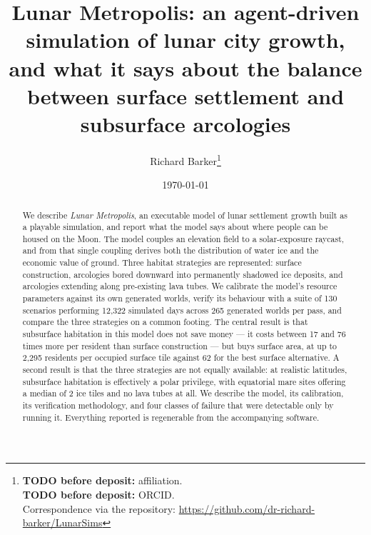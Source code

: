 \documentclass[11pt,a4paper]{article}
\title{\textbf{Lunar Metropolis}: an agent-driven simulation of lunar city
growth, and what it says about the balance between surface settlement and
subsurface arcologies}
\author{Richard Barker\thanks{%
  \textbf{TODO before deposit:} affiliation. \\
  \textbf{TODO before deposit:} ORCID. \\
  Correspondence via the repository:
  \url{https://github.com/dr-richard-barker/LunarSims}}}
\date{\today}
\begin{document}
\maketitle

\begin{abstract}
\noindent
We describe \emph{Lunar Metropolis}, an executable model of lunar settlement
growth built as a playable simulation, and report what the model says about
where people can be housed on the Moon. The model couples an elevation field
to a solar-exposure raycast, and from that single coupling derives both the
distribution of water ice and the economic value of ground. Three habitat
strategies are represented: surface construction, arcologies bored downward
into permanently shadowed ice deposits, and arcologies extending along
pre-existing lava tubes. We calibrate the model's resource parameters against
its own generated worlds, verify its behaviour with a suite of 130 scenarios
performing 12{,}322 simulated days across 265 generated worlds per pass, and
compare the three strategies on a common footing. The central result is that
subsurface habitation in this model does not save money --- it costs between
17 and 76 times more per resident than surface construction --- but buys
surface area, at up to 2{,}295 residents per occupied surface tile against 62
for the best surface alternative. A second result is that the three strategies
are not equally available: at realistic latitudes, subsurface habitation is
effectively a polar privilege, with equatorial mare sites offering a median of
2 ice tiles and no lava tubes at all. We describe the model, its calibration,
its verification methodology, and four classes of failure that were detectable
only by running it. Everything reported is regenerable from the accompanying
software.
\end{abstract}













\end{document}
